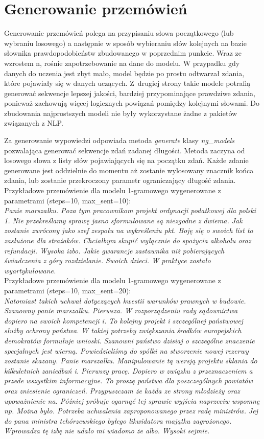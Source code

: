 \documentclass[a4paper,11pt,twoside]{report}
\theoremstyle{definition}
\begin{document}
\section{Generowanie przemówień} \label{section:gen}

Generowanie przemówień polega na przypisaniu słowa początkowego (lub wybraniu losowego) a następnie w sposób wybieraniu słów kolejnych na bazie słownika prawdopodobieństw zbudowanego w poprzednim punkcie.
Wraz ze wzrostem n, rośnie zapotrzebowanie na dane do modelu. W przypadku gdy danych do uczenia jest zbyt mało, model będzie po prostu odtwarzał zdania, które pojawiały się w danych uczących. Z~drugiej strony takie modele potrafią generować sekwencje lepszej jakości, bardziej przypominające prawdziwe zdania, ponieważ zachowują więcej logicznych powiązań pomiędzy kolejnymi słowami.
Do zbudowania najprostszych modeli nie były wykorzystane żadne z pakietów związanych z NLP. 

Za generowanie wypowiedzi odpowiada metoda \textit{generate} klasy \textit{ng\_models} pozwalająca generować sekwencje zdań zadanej długości. Metoda zaczyna od losowego słowa z listy słów pojawiających się na początku zdań. Każde zdanie generowane jest oddzielnie do momentu aż zostanie wylosowany znacznik końca zdania, lub zostanie przekroczony parametr ograniczający długość zdania.\\
Przykładowe przemówienie dla modelu 1-gramowego wygenerowane z parametrami (steps=10, max\_sent=10):\\
\textit{Panie marszałku. Poza tym pracownikom projekt ordynacji podatkowej dla polski 1. Nie przekreślamy sprawę jasno sformułowane są niezgodne z dwiema. Jak zostanie zwrócony jako szef zespołu na wykreśleniu pkt. Boję się o swoich list to zasłużone dla strażaków. Chciałbym skupić wyłącznie do spożycia alkoholu oraz refundacji. Wysoka izbo. Jakie gwarancje zastawnika niż pobierających świadczenia z góry rozdzielanie. Swoich dzieci. W praktyce zostało wyartykułowane.} \\

Przykładowe przemówienie dla modelu 1-gramowego wygenerowane z parametrami (steps=10, max\_sent=20):\\
\textit{Natomiast takich uchwał dotyczących kwestii warunków prawnych w budowie. Szanowny panie marszałku. Pierwsza. W rozporządzeniu rady sądownictwa dopiero na swoich kompetencji i. To kolejny projekt i szczególnej państwowej służby ochrony państwa. W takiej potrzeby zwiększania środków europejskich demokratów formułuje wnioski. Szanowni państwo dzisiaj o szczególne znaczenie specjalnych jest wierną. Powiedzieliśmy do spółki na stworzenie nowej rezerwy zostanie skazany. Panie marszałku. Manipulowanie tą wersją projektu skłania do kilkuletnich zaniedbań i. Pierwszy pracę. Dopiero w związku z przeznaczeniem a przede wszystkim informacyjne. To proszę państwa dla poszczególnych powiatów oraz zniesienie ograniczeń. Przypuszczam że każda ze strony młodzieży oraz upoważnienie na. Później próbuje ogarnąć tej sprawie wyjścia naprzeciw wspomnę np. Można było. Potrzeba uchwalenia zaproponowanego przez radę ministrów. Jej do pana ministra tchórzewskiego byłego likwidatora majątku zagrożonego. Wprowadza tę izbę nie udało mi wiadomo że albo. Wysoki sejmie.}\\
\end{document}
